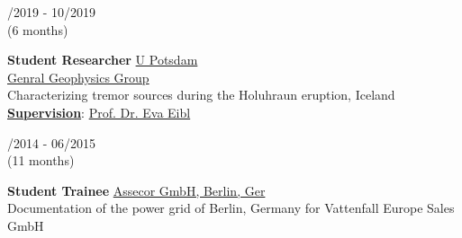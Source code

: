 \documentclass{article}
\newcommand{\spacingWork}{0.25cm}
\begin{document}
\begin{minipage}[t]{0.69\textwidth}
\begin{minipage}[t]{0.99\textwidth}
				\begin{minipage}[t]{0.2\textwidth}
				/2019 - 10/2019 \\(6 months)
				\end{minipage}
				\hfill
				\begin{minipage}[t]{0.75\textwidth}
				\textbf{Student Researcher}\hfill 
				\href{https://www.geo.uni-potsdam.de/}{\color{pblue}U Potsdam}\\
				\href{http://www.geo.uni-potsdam.de/allgemeine-geophysik-1570.html}{Genral Geophysics Group}\\
			    Characterizing tremor sources during the Holuhraun eruption, Iceland\\
			    \textbf{\underline{Supervision}}: \href{mailto:eva.eibl@un-potsdam.de }{\color{pblue}Prof. Dr. Eva Eibl }
				\end{minipage} 
				
%		
				
		\vspace{\spacingWork}
		
		\begin{minipage}[t]{0.2\textwidth}
			/2014 - 06/2015\\(11 months)
		\end{minipage}
		\hfill
		\begin{minipage}[t]{0.75\textwidth}
			\textbf{Student Trainee}\hfill
			\href{https://assecor.de/}{\color{pblue}Assecor GmbH, Berlin, Ger}\\
			Documentation of the power grid of Berlin, Germany for Vattenfall Europe Sales GmbH
		\end{minipage}


\end{minipage}
\end{minipage}
\end{document}

